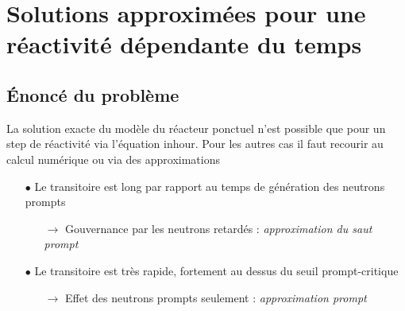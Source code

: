 \section{Solutions approximées pour une réactivité dépendante du temps}
\subsection{Énoncé du problème}
La solution exacte du modèle du réacteur ponctuel n'est possible que pour un step de réactivité via 
l'équation inhour. Pour les autres cas il faut recourir au calcul numérique ou via des approximations
\begin{itemize}
\item[$\bullet$] Le transitoire est long par rapport au temps de génération des neutrons prompts
\begin{itemize}
\item[$\to$] Gouvernance par les neutrons retardés : \textit{approximation du saut prompt}
\end{itemize}
\item[$\bullet$] Le transitoire est très rapide, fortement au dessus du seuil prompt-critique
\begin{itemize}
\item[$\to$] Effet des neutrons prompts seulement : \textit{approximation prompt}
\end{itemize}
\end{itemize}



